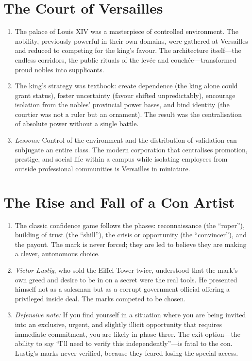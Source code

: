\documentclass[12pt,a4paper,oneside]{book}
\begin{document}
\section{The Court of Versailles}
\begin{enumerate}[leftmargin=*, label=\arabic*.]
\item The palace of Louis XIV was a masterpiece of controlled environment. The nobility, previously powerful in their own domains, were gathered at Versailles and reduced to competing for the king's favour. The architecture itself—the endless corridors, the public rituals of the levée and couchée—transformed proud nobles into supplicants.
\item The king's strategy was textbook: create dependence (the king alone could grant status), foster uncertainty (favour shifted unpredictably), encourage isolation from the nobles' provincial power bases, and bind identity (the courtier was not a ruler but an ornament). The result was the centralisation of absolute power without a single battle.
\item \textit{Lessons:} Control of the environment and the distribution of validation can subjugate an entire class. The modern corporation that centralises promotion, prestige, and social life within a campus while isolating employees from outside professional communities is Versailles in miniature.
\end{enumerate}

\section{The Rise and Fall of a Con Artist}
\begin{enumerate}[leftmargin=*, label=\arabic*.]
\item The classic confidence game follows the phases: reconnaissance (the “roper”), building of trust (the “shill”), the crisis or opportunity (the “convincer”), and the payout. The mark is never forced; they are led to believe they are making a clever, autonomous choice.
\item \textit{Victor Lustig}, who sold the Eiffel Tower twice, understood that the mark's own greed and desire to be in on a secret were the real tools. He presented himself not as a salesman but as a corrupt government official offering a privileged inside deal. The marks competed to be chosen.
\item \textit{Defensive note:} If you find yourself in a situation where you are being invited into an exclusive, urgent, and slightly illicit opportunity that requires immediate commitment, you are likely in phase three. The exit option—the ability to say “I'll need to verify this independently”—is fatal to the con. Lustig's marks never verified, because they feared losing the special access.
\end{enumerate}
\end{document}
